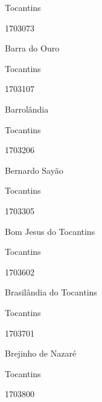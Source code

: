 \documentclass[
  letterpaper,
]{report}
\begin{document}
Tocantins

\n      

1703073

\n      

Barra do Ouro

\n    

\n    

\n      

Tocantins

\n      

1703107

\n      

Barrolândia

\n    

\n    

\n      

Tocantins

\n      

1703206

\n      

Bernardo Sayão

\n    

\n    

\n      

Tocantins

\n      

1703305

\n      

Bom Jesus do Tocantins

\n    

\n    

\n      

Tocantins

\n      

1703602

\n      

Brasilândia do Tocantins

\n    

\n    

\n      

Tocantins

\n      

1703701

\n      

Brejinho de Nazaré

\n    

\n    

\n      

Tocantins

\n      

1703800

\n      
\end{document}
